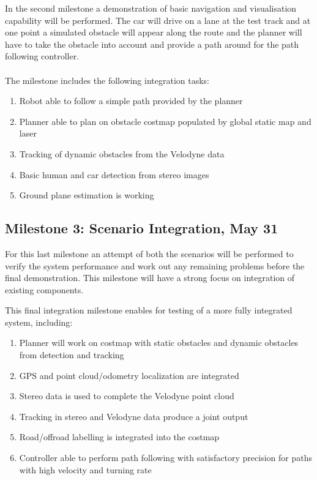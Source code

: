 \documentclass[11pt,a4paper]{article}
\begin{document}
In the second milestone a demonstration of basic navigation and visualisation capability will be performed.
The car will drive on a lane at the test track and at one point a
simulated obstacle will appear along the route and the planner will have to take the obstacle into account and provide a path around for the path following controller. \\ \\
The milestone includes the following integration tasks:
\begin{enumerate}
\item Robot able to follow a simple path provided by the planner
\item Planner able to plan on obstacle costmap populated by global static map and laser
\item Tracking of dynamic obstacles from the Velodyne data
\item Basic human and car detection from stereo images
\item Ground plane estimation is working
\end{enumerate}

\subsection{Milestone 3: Scenario Integration, May 31}
\label{milestone3}

For this last milestone an attempt of both the scenarios will be performed to verify the system performance and work out any remaining problems before the final demonstration. This milestone will have a strong
focus on integration of existing components.

This final integration milestone enables for testing
of a more fully integrated system, including:
\begin{enumerate}
\item Planner will work on costmap with static obstacles and dynamic obstacles from detection and tracking
\item GPS and point cloud/odometry localization are integrated
\item Stereo data is used to complete the Velodyne point cloud
\item Tracking in stereo and Velodyne data produce a joint output
\item Road/offroad labelling is integrated into the costmap
\item Controller able to perform path following with satisfactory precision for paths with high velocity and turning rate
\end{enumerate}
\end{document}
